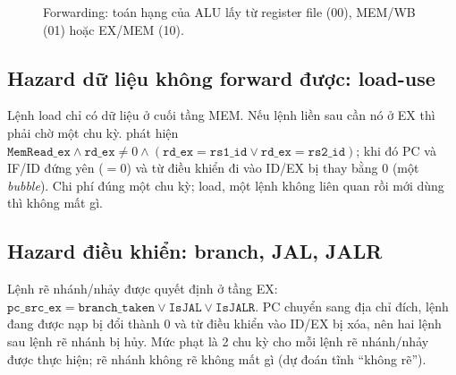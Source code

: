 \documentclass[11pt,a4paper]{article}
\newcommand{\sig}[1]{\texttt{\detokenize{#1}}}
\begin{document}
\begin{figure}[htbp]
\centering
{}
\caption{Forwarding: toán hạng của ALU lấy từ register file (00), MEM/WB (01) hoặc EX/MEM (10).}
\label{fig:fwd}
\end{figure}

\subsection{Hazard dữ liệu không forward được: load-use}
Lệnh load chỉ có dữ liệu ở cuối tầng MEM. Nếu lệnh liền sau cần nó ở EX thì phải chờ một chu kỳ. \sig{HazardUnit} phát hiện
$\mathtt{MemRead\_ex}\wedge\mathtt{rd\_ex}\ne0\wedge(\mathtt{rd\_ex}=\mathtt{rs1\_id}\lor\mathtt{rd\_ex}=\mathtt{rs2\_id})$; khi đó PC và IF/ID đứng yên
(\sig{run}$=0$) và từ điều khiển đi vào ID/EX bị thay bằng 0 (một \emph{bubble}). Chi phí đúng một chu kỳ; load, một lệnh không liên quan rồi mới dùng thì không mất gì.

\subsection{Hazard điều khiển: branch, JAL, JALR}
Lệnh rẽ nhánh/nhảy được quyết định ở tầng EX: $\mathtt{pc\_src\_ex}=\mathtt{branch\_taken}\lor\mathtt{IsJAL}\lor\mathtt{IsJALR}$. PC chuyển sang địa chỉ đích, lệnh đang được nạp bị đổi thành 0
và từ điều khiển vào ID/EX bị xóa, nên hai lệnh sau lệnh rẽ nhánh bị hủy. Mức phạt là 2 chu kỳ cho mỗi lệnh rẽ nhánh/nhảy được thực hiện; rẽ nhánh không rẽ không mất gì (dự đoán tĩnh ``không rẽ'').
\end{document}
